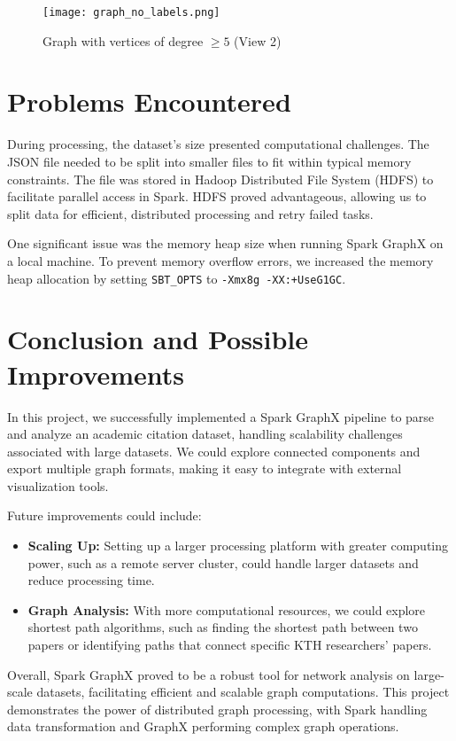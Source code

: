 \documentclass[a4paper, 11pt]{article}
\begin{document}
\begin{figure}[h!]
    \centering
    \texttt{[image: graph\_no\_labels.png]} %
    \caption{Graph with vertices of degree $\geq 5$ (View 2)}
    \label{fig:graph_view2}
\end{figure}


\section{Problems Encountered}

During processing, the dataset’s size presented computational challenges. The JSON file needed to be split into smaller files to fit within typical memory constraints. The file was stored in Hadoop Distributed File System (HDFS) to facilitate parallel access in Spark. HDFS proved advantageous, allowing us to split data for efficient, distributed processing and retry failed tasks.

One significant issue was the memory heap size when running Spark GraphX on a local machine. To prevent memory overflow errors, we increased the memory heap allocation by setting \texttt{SBT\_OPTS} to \texttt{-Xmx8g -XX:+UseG1GC}.

\section{Conclusion and Possible Improvements}

In this project, we successfully implemented a Spark GraphX pipeline to parse and analyze an academic citation dataset, handling scalability challenges associated with large datasets. We could explore connected components and export multiple graph formats, making it easy to integrate with external visualization tools.

Future improvements could include:
\begin{itemize}
    \item \textbf{Scaling Up:} Setting up a larger processing platform with greater computing power, such as a remote server cluster, could handle larger datasets and reduce processing time.
    \item \textbf{Graph Analysis:} With more computational resources, we could explore shortest path algorithms, such as finding the shortest path between two papers or identifying paths that connect specific KTH researchers' papers.
\end{itemize}

Overall, Spark GraphX proved to be a robust tool for network analysis on large-scale datasets, facilitating efficient and scalable graph computations. This project demonstrates the power of distributed graph processing, with Spark handling data transformation and GraphX performing complex graph operations.
\end{document}
